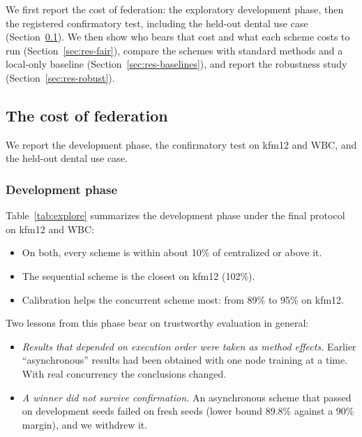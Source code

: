 \documentclass[pdflatex,sn-mathphys-num]{sn-jnl}
\begin{document}
We first report the cost of federation: the exploratory development phase, then the registered confirmatory test, including the held-out dental use case (Section~\ref{sec:res-cost-fed}). We then show who bears that cost and what each scheme costs to run (Section~\ref{sec:res-fair}), compare the schemes with standard methods and a local-only baseline (Section~\ref{sec:res-baselines}), and report the robustness study (Section~\ref{sec:res-robust}).

\subsection{The cost of federation}\label{sec:res-cost-fed}
We report the development phase, the confirmatory test on kfm12 and WBC, and the held-out dental use case.

\subsubsection{Development phase}\label{sec:res-explore}
Table~\ref{tab:explore} summarizes the development phase under the final protocol on kfm12 and WBC:
\begin{itemize}
\item On both, every scheme is within about 10\% of centralized or above it.
\item The sequential scheme is the closest on kfm12 (102\%).
\item Calibration helps the concurrent scheme most: from 89\% to 95\% on kfm12.
\end{itemize}
Two lessons from this phase bear on trustworthy evaluation in general:
\begin{itemize}
\item \emph{Results that depended on execution order were taken as method effects.} Earlier ``asynchronous'' results had been obtained with one node training at a time. With real concurrency the conclusions changed.
\item \emph{A winner did not survive confirmation.} An asynchronous scheme that passed on development seeds failed on fresh seeds (lower bound 89.8\% against a 90\% margin), and we withdrew it.
\end{itemize}
\end{document}
